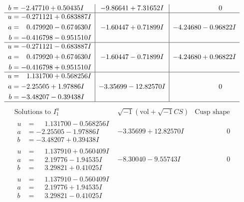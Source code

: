 \documentclass[1p]{elsarticle_modified}
\theoremstyle{definition}
\newcommand{\I}{\sqrt{-1}}
\begin{document}
$$\begin{array}{c|c|c}
\begin{aligned}
b &= -2.47710 + 0.50435 I\end{aligned}
 & -9.86641 + 7.31652 I & \phantom{-0.000000 } 0 \\ \hline\begin{aligned}
u &= -0.271121 + 0.683887 I \\
a &= \phantom{-}0.479920 - 0.674630 I \\
b &= -0.416798 - 0.951510 I\end{aligned}
 & -1.60447 + 0.71899 I & -4.24680 - 0.96822 I \\ \hline\begin{aligned}
u &= -0.271121 - 0.683887 I \\
a &= \phantom{-}0.479920 + 0.674630 I \\
b &= -0.416798 + 0.951510 I\end{aligned}
 & -1.60447 - 0.71899 I & -4.24680 + 0.96822 I \\ \hline\begin{aligned}
u &= \phantom{-}1.131700 + 0.568256 I \\
a &= -2.25505 + 1.97886 I \\
b &= -3.48207 - 0.39438 I\end{aligned}
 & -3.35699 - 12.82570 I & \phantom{-0.000000 } 0\\
 \hline 
 \end{array}$$\newpage$$\begin{array}{c|c|c}  
\text{Solutions to }I^u_{1}& \I (\text{vol} + \sqrt{-1}CS) & \text{Cusp shape}\\
 \hline 
\begin{aligned}
u &= \phantom{-}1.131700 - 0.568256 I \\
a &= -2.25505 - 1.97886 I \\
b &= -3.48207 + 0.39438 I\end{aligned}
 & -3.35699 + 12.82570 I & \phantom{-0.000000 } 0 \\ \hline\begin{aligned}
u &= \phantom{-}1.137910 + 0.560409 I \\
a &= \phantom{-}2.19776 - 1.94535 I \\
b &= \phantom{-}3.29821 + 0.41025 I\end{aligned}
 & -8.30040 - 9.55743 I & \phantom{-0.000000 } 0 \\ \hline\begin{aligned}
u &= \phantom{-}1.137910 - 0.560409 I \\
a &= \phantom{-}2.19776 + 1.94535 I \\
b &= \phantom{-}3.29821 - 0.41025 I\end{aligned}

\end{array}$$
\end{document}
